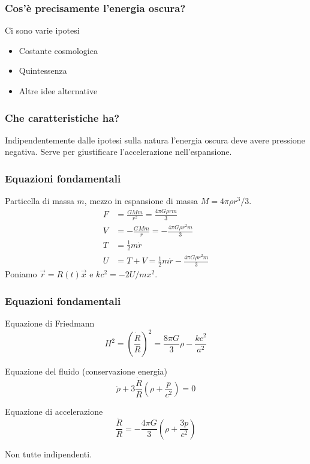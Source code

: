 \begin{frame}
  \frametitle{Cos'è precisamente l'energia oscura?}
  Ci sono varie ipotesi
  \begin{itemize}
  \item Costante cosmologica
  \item Quintessenza
  \item Altre idee alternative
  \end{itemize}
\end{frame}

\begin{frame}
  \frametitle{Che caratteristiche ha?}
  Indipendentemente dalle ipotesi sulla natura l'energia oscura deve avere
  \alert{pressione negativa}. Serve per giustificare l'accelerazione
  nell'espansione.
\end{frame}

\begin{frame}
  \frametitle[]{Equazioni fondamentali}
  Particella di massa $m$, mezzo in espansione di massa $M = 4\pi\rho r^3/3$.
  \begin{align*}
    F &= \frac{GMm}{r^2} = \frac{4\pi G \rho r m}{3} \\
    V &= -\frac{GMm}{r} = -\frac{4\pi G \rho r^2 m}{3} \\
    T &= \frac{1}{2}m\dot{r} \\
    U &= T + V = \frac{1}{2}m\dot{r} - \frac{4\pi G \rho r^2 m}{3}
  \end{align*}
  Poniamo $\vec{r} = R(t)\vec{x}$ e $kc^2 = -2U/mx^2$.
\end{frame}

\begin{frame}
  \frametitle{Equazioni fondamentali}
  \begin{block}{Equazione di Friedmann}
    \begin{equation*}
      H^2 = \left( \frac{\dot{R}}{R} \right)^2 = \frac{8\pi G}{3}\rho -
      \frac{kc^2}{a^2}
    \end{equation*}
  \end{block}
  \pause{}
  \begin{block}{Equazione del fluido (conservazione energia)}
    \begin{equation*}
      \dot{\rho} + 3\frac{\dot{R}}{R}\left( \rho + \frac{p}{c^2} \right) = 0
    \end{equation*}
  \end{block}
  \pause{}
  \begin{block}{Equazione di accelerazione}
    \begin{equation*}
    \frac{\ddot{R}}{R} = -\frac{4\pi G}{3}\left( \rho + \frac{3p}{c^2} \right)
  \end{equation*}
  \end{block}
  Non tutte indipendenti.
\end{frame}

